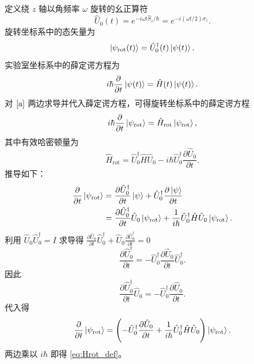 \documentclass[12pt,a4paper]{article}
\begin{document}
	定义绕 $z$ 轴以角频率 $\omega$ 旋转的幺正算符
	\begin{equation}
		\hat{U}_0(t) = e^{-i\omega t \hat{S}_z/\hbar} = e^{-i(\omega t/2)\sigma_z}.
	\end{equation}
	旋转坐标系中的态矢量为
	\begin{equation}\label{a}
		\ket{\psi_{\text{rot}}(t)} = \hat{U}_0^\dagger(t) \ket{\psi(t)}.
	\end{equation}
	实验室坐标系中的薛定谔方程为
	\begin{equation}
		i\hbar \frac{\partial}{\partial t}\ket{\psi(t)} = \hat{H}(t) \ket{\psi(t)}.
	\end{equation}
	对 \(\eqref{a}\) 两边求导并代入薛定谔方程，可得旋转坐标系中的薛定谔方程
	\begin{equation}
		i\hbar \frac{\partial}{\partial t}\ket{\psi_{\text{rot}}} = \hat{H}_{\text{rot}} \ket{\psi_{\text{rot}}},
	\end{equation}
	其中有效哈密顿量为
	\begin{equation}
		\boxed{\hat{H}_{\text{rot}} = \hat{U}_0^\dagger \hat{H} \hat{U}_0 - i\hbar \hat{U}_0^\dagger \frac{\partial \hat{U}_0}{\partial t}}. \label{eq:Hrot_def}
	\end{equation}
	推导如下：
	\begin{align}
		\frac{\partial}{\partial t}\ket{\psi_{\text{rot}}} &= \frac{\partial \hat{U}_0^\dagger}{\partial t} \ket{\psi} + \hat{U}_0^\dagger \frac{\partial \ket{\psi}}{\partial t} \notag\\
		&= \frac{\partial \hat{U}_0^\dagger}{\partial t} \hat{U}_0 \ket{\psi_{\text{rot}}} + \frac{1}{i\hbar} \hat{U}_0^\dagger \hat{H} \hat{U}_0 \ket{\psi_{\text{rot}}}.
	\end{align}
	利用 $\hat{U}_0 \hat{U}_0^\dagger = I$ 求导得 $\frac{\partial \hat{U}_0}{\partial t} \hat{U}_0^\dagger + \hat{U}_0 \frac{\partial \hat{U}_0^\dagger}{\partial t}=0$
	\begin{equation}
		\frac{\partial \hat{U}_0^\dagger}{\partial t} = -\hat{U}_0^\dagger \frac{\partial \hat{U}_0}{\partial t} \hat{U}_0^\dagger.
	\end{equation}
	因此
	\begin{equation}
		\frac{\partial \hat{U}_0^\dagger}{\partial t} \hat{U}_0 = -\hat{U}_0^\dagger \frac{\partial \hat{U}_0}{\partial t}.
	\end{equation}
	代入得
	\begin{equation}
		\frac{\partial}{\partial t}\ket{\psi_{\text{rot}}} = \left( -\hat{U}_0^\dagger \frac{\partial \hat{U}_0}{\partial t} + \frac{1}{i\hbar} \hat{U}_0^\dagger \hat{H} \hat{U}_0 \right) \ket{\psi_{\text{rot}}}.
	\end{equation}
	两边乘以 $i\hbar$ 即得 \eqref{eq:Hrot_def}。
	
\end{document}
